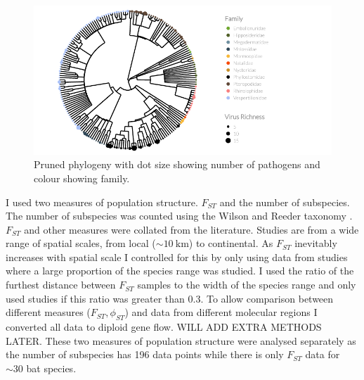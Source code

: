 \begin{knitrout}\footnotesize
{}\color{fgcolor}\begin{figure}[t]

{\centering \includegraphics[width=\textwidth]{figure/treePlot-1} 

}

\caption[Pruned phylogeny with dot size showing number of pathogens and colour showing family]{Pruned phylogeny with dot size showing number of pathogens and colour showing family.}\label{fig:treePlot}
\end{figure}


\end{knitrout}












I used two measures of population structure. 
$F_{ST}$ and the number of subspecies.
The number of subspecies was counted using the Wilson and Reeder taxonomy \cite{wilson2005mammal}.
$F_{ST}$ and other measures were collated from the literature.
Studies are from a wide range of spatial scales, from local ($\sim\SI{10}{\kilo\metre}$) to continental.
As $F_{ST}$ inevitably increases with spatial scale I controlled for this by only using data from studies where a large proportion of the species range was studied.
I used the ratio of the furthest distance between $F_{ST}$ samples to the width of the species range and only used studies if this ratio was greater than 0.3.
To allow comparison between different measures ($F_{ST}, \phi_{ST}$) and data from different molecular regions I converted all data to diploid gene flow.
WILL ADD EXTRA METHODS LATER.
These two measures of population structure were analysed separately as the number of subspecies has 196 data points while there is only $F_{ST}$ data for $\sim 30$ bat species.

